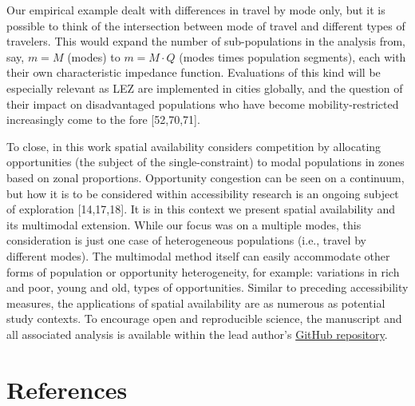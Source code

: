 \documentclass[10pt,letterpaper]{article}
\begin{document}
Our empirical example dealt with differences in travel by mode only, but
it is possible to think of the intersection between mode of travel and
different types of travelers. This would expand the number of
sub-populations in the analysis from, say, \(m=M\) (modes) to
\(m = M\cdot Q\) (modes times population segments), each with their own
characteristic impedance function. Evaluations of this kind will be
especially relevant as LEZ are implemented in cities globally, and the
question of their impact on disadvantaged populations who have become
mobility-restricted increasingly come to the fore {[}52,70,71{]}.

To close, in this work spatial availability considers competition by
allocating opportunities (the subject of the single-constraint) to modal
populations in zones based on zonal proportions. Opportunity congestion
can be seen on a continuum, but how it is to be considered within
accessibility research is an ongoing subject of exploration
{[}14,17,18{]}. It is in this context we present spatial availability
and its multimodal extension. While our focus was on a multiple modes,
this consideration is just one case of heterogeneous populations (i.e.,
travel by different modes). The multimodal method itself can easily
accommodate other forms of population or opportunity heterogeneity, for
example: variations in rich and poor, young and old, types of
opportunities. Similar to preceding accessibility measures, the
applications of spatial availability are as numerous as potential study
contexts. To encourage open and reproducible science, the manuscript and
all associated analysis is available within the lead author's
\href{https://github.com/soukhova/Multimodal-spatial-availability}{GitHub
repository}.

\hypertarget{references}{%
\section*{References}\label{references}}
\end{document}
